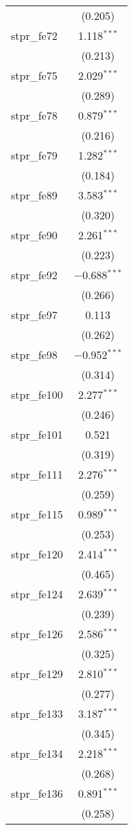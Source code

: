 \begin{table}[!htbp]
\begin{tabular}{@{\extracolsep{5pt}}lc}
  & (0.205) \\ 
  stpr\_fe72 & 1.118$^{***}$ \\ 
  & (0.213) \\ 
  stpr\_fe75 & 2.029$^{***}$ \\ 
  & (0.289) \\ 
  stpr\_fe78 & 0.879$^{***}$ \\ 
  & (0.216) \\ 
  stpr\_fe79 & 1.282$^{***}$ \\ 
  & (0.184) \\ 
  stpr\_fe89 & 3.583$^{***}$ \\ 
  & (0.320) \\ 
  stpr\_fe90 & 2.261$^{***}$ \\ 
  & (0.223) \\ 
  stpr\_fe92 & $-$0.688$^{***}$ \\ 
  & (0.266) \\ 
  stpr\_fe97 & 0.113 \\ 
  & (0.262) \\ 
  stpr\_fe98 & $-$0.952$^{***}$ \\ 
  & (0.314) \\ 
  stpr\_fe100 & 2.277$^{***}$ \\ 
  & (0.246) \\ 
  stpr\_fe101 & 0.521 \\ 
  & (0.319) \\ 
  stpr\_fe111 & 2.276$^{***}$ \\ 
  & (0.259) \\ 
  stpr\_fe115 & 0.989$^{***}$ \\ 
  & (0.253) \\ 
  stpr\_fe120 & 2.414$^{***}$ \\ 
  & (0.465) \\ 
  stpr\_fe124 & 2.639$^{***}$ \\ 
  & (0.239) \\ 
  stpr\_fe126 & 2.586$^{***}$ \\ 
  & (0.325) \\ 
  stpr\_fe129 & 2.810$^{***}$ \\ 
  & (0.277) \\ 
  stpr\_fe133 & 3.187$^{***}$ \\ 
  & (0.345) \\ 
  stpr\_fe134 & 2.218$^{***}$ \\ 
  & (0.268) \\ 
  stpr\_fe136 & 0.891$^{***}$ \\ 
  & (0.258) \\ 

\end{tabular}
\end{table}
